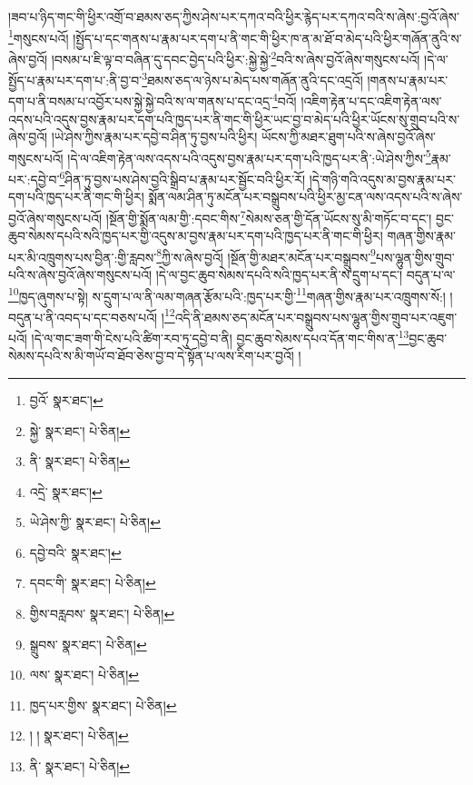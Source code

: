 །ཟབ་པ་ཉིད་གང་གི་ཕྱིར་འགྲོ་བ་ཐམས་ཅད་ཀྱིས་ཤེས་པར་དཀའ་བའི་ཕྱིར་རྙེད་པར་དཀའ་བའི་ས་ཞེས་:བྱའོ་ཞེས་\footnote{བྱའོ་  སྣར་ཐང་། }གསུངས་པའོ། །སྤྱོད་པ་དང་གནས་པ་རྣམ་པར་དག་པ་ནི་གང་གི་ཕྱིར་ཁ་ན་མ་ཐོ་བ་མེད་པའི་ཕྱིར་གཞོན་ནུའི་ས་ཞེས་བྱའོ། །བསམ་པ་ཇི་ལྟ་བ་བཞིན་དུ་དབང་བྱེད་པའི་ཕྱིར་:སྐྱེ་སྐྱེ་\footnote{སྐྱེ་  སྣར་ཐང་།  པེ་ཅིན། }བའི་ས་ཞེས་བྱའོ་ཞེས་གསུངས་པའོ། །དེ་ལ་སྤྱོད་པ་རྣམ་པར་དག་པ་:ནི་བྱ་བ་\footnote{ནི་  སྣར་ཐང་།  པེ་ཅིན། }ཐམས་ཅད་ལ་ཉེས་པ་མེད་པས་གཞོན་ནུའི་དང་འདྲའོ། །གནས་པ་རྣམ་པར་དག་པ་ནི་བསམ་པ་འབྱོར་པས་སྐྱེ་སྐྱེ་བའི་ས་ལ་གནས་པ་དང་འདྲ་\footnote{འདྲེ་  སྣར་ཐང་། }བའོ། །འཇིག་རྟེན་པ་དང་འཇིག་རྟེན་ལས་འདས་པའི་འདུས་བྱས་རྣམ་པར་དག་པའི་ཁྱད་པར་ནི་གང་གི་ཕྱིར་ཡང་བྱ་བ་མེད་པའི་ཕྱིར་ཡོངས་སུ་གྲུབ་པའི་ས་ཞེས་བྱའོ། །ཡེ་ཤེས་ཀྱིས་རྣམ་པར་དབྱེ་བ་ཤིན་ཏུ་བྱས་པའི་ཕྱིར། ཡོངས་ཀྱི་མཐར་ཐུག་པའི་ས་ཞེས་བྱའོ་ཞེས་གསུངས་པའོ། །དེ་ལ་འཇིག་རྟེན་ལས་འདས་པའི་འདུས་བྱས་རྣམ་པར་དག་པའི་ཁྱད་པར་ནི་:ཡེ་ཤེས་ཀྱིས་\footnote{ཡེ་ཤེས་ཀྱི་  སྣར་ཐང་།  པེ་ཅིན། }རྣམ་པར་:དབྱེ་བ་\footnote{དབྱེ་བའི་  སྣར་ཐང་། }ཤིན་ཏུ་བྱས་པས་ཤེས་བྱའི་སྒྲིབ་པ་རྣམ་པར་སྦྱོང་བའི་ཕྱིར་རོ། །དེ་གཉི་གའི་འདུས་མ་བྱས་རྣམ་པར་དག་པའི་ཁྱད་པར་ནི་གང་གི་ཕྱིར། སྨོན་ལམ་ཤིན་ཏུ་མངོན་པར་བསྒྲུབས་པའི་ཕྱིར་མྱ་ངན་ལས་འདས་པའི་ས་ཞེས་བྱའོ་ཞེས་གསུངས་པའོ། །སྔོན་གྱི་སྨོན་ལམ་གྱི་:དབང་གིས་\footnote{དབང་གི་  སྣར་ཐང་།  པེ་ཅིན། }སེམས་ཅན་གྱི་དོན་ཡོངས་སུ་མི་གཏོང་བ་དང་། བྱང་ཆུབ་སེམས་དཔའི་སའི་ཁྱད་པར་གྱི་འདུས་མ་བྱས་རྣམ་པར་དག་པའི་ཁྱད་པར་ནི་གང་གི་ཕྱིར། གཞན་གྱིས་རྣམ་པར་མི་འཁྲུགས་པས་བྱིན་:གྱི་རླབས་\footnote{གྱིས་བརླབས་  སྣར་ཐང་།  པེ་ཅིན། }ཀྱི་ས་ཞེས་བྱའོ། །སྔོན་གྱི་མཐར་མངོན་པར་བསྒྲུབས་\footnote{སྒྲུབས་  སྣར་ཐང་།  པེ་ཅིན། }པས་ལྷུན་གྱིས་གྲུབ་པའི་ས་ཞེས་བྱའོ་ཞེས་གསུངས་པའོ། །དེ་ལ་བྱང་ཆུབ་སེམས་དཔའི་སའི་ཁྱད་པར་ནི་ས་དྲུག་པ་དང་། བདུན་པ་ལ་\footnote{ལས་  སྣར་ཐང་།  པེ་ཅིན། }ཁྱད་ཞུགས་པ་སྟེ། ས་དྲུག་པ་ལ་ནི་ལམ་གཞན་རྩོམ་པའི་:ཁྱད་པར་གྱི་\footnote{ཁྱད་པར་གྱིས་  སྣར་ཐང་།  པེ་ཅིན། }གཞན་གྱིས་རྣམ་པར་འཁྲུགས་སོ:། །བདུན་པ་ནི་འབད་པ་དང་བཅས་པའོ། །\footnote{། །  སྣར་ཐང་།  པེ་ཅིན། }འདི་ནི་ཐམས་ཅད་མངོན་པར་བསྒྲུབས་པས་ལྷུན་གྱིས་གྲུབ་པར་འཇུག་པའོ། །དེ་ལ་གང་ཟག་གི་ངེས་པའི་ཚིག་རབ་ཏུ་དབྱེ་བ་ནི། བྱང་ཆུབ་སེམས་དཔའ་དོན་གང་གིས་ན་\footnote{ནི་  སྣར་ཐང་།  པེ་ཅིན། }བྱང་ཆུབ་སེམས་དཔའི་ས་མི་གཡོ་བ་ཐོབ་ཅེས་བྱ་བ་དེ་སྟོན་པ་ལས་རིག་པར་བྱའོ། །
